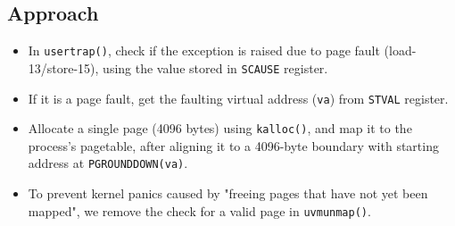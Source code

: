 \documentclass[11pt,a4paper,english]{paper}
\newenvironment{colorboxed}[4][gray]{
\begin{tcolorbox}[colback=#1!3!white,colframe=#1(ryb)!50!black,title=\textbf{#2: #3},#4]
}{
\end{tcolorbox}
}
\begin{document}
\begin{colorboxed}{Code}{\texttt{kernel/vm.c::uvmunmap()}}{unbreakable}
    \inputminted[baselinestretch=0.85,firstline=148,lastline=168,breaklines]{c}{kernel/vm.c}
\end{colorboxed}

\subsection{Approach}
\begin{itemize}[nolistsep,noitemsep]
    \item In \texttt{usertrap()}, check if the exception is raised due to page fault (load-13/store-15), using the value stored in \texttt{SCAUSE} register.
    \item If it is a page fault, get the faulting virtual address (\texttt{va}) from \texttt{STVAL} register.
    \item Allocate a single page (4096 bytes) using \texttt{kalloc()}, and map it to the process's pagetable, after aligning it to a 4096-byte boundary with starting address at \texttt{PGROUNDDOWN(va)}.
    \item To prevent kernel panics caused by "freeing pages that have not yet been mapped", we remove the check for a valid page in \texttt{uvmunmap()}.

\end{itemize}


%
%
\end{document}
